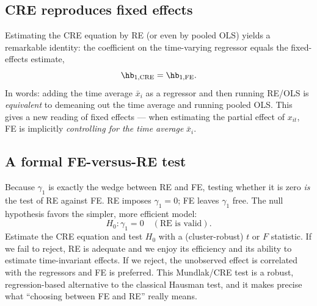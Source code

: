 \subsection{CRE reproduces fixed effects}

Estimating the CRE equation by RE (or even by pooled OLS) yields a remarkable identity: the coefficient on the time-varying regressor equals the fixed-effects estimate,
\[
\hb_{1,\text{CRE}} = \hb_{1,\text{FE}}.
\]
In words: adding the time average $\bar x_i$ as a regressor and then running RE/OLS is \emph{equivalent} to demeaning out the time average and running pooled OLS. This gives a new reading of fixed effects --- when estimating the partial effect of $x_{it}$, FE is implicitly \emph{controlling for the time average} $\bar x_i$.


\subsection{A formal FE-versus-RE test}

Because $\gamma_1$ is exactly the wedge between RE and FE, testing whether it is zero \emph{is} the test of RE against FE. RE imposes $\gamma_1=0$; FE leaves $\gamma_1$ free. The null hypothesis favors the simpler, more efficient model:
\[
H_0: \gamma_1 = 0 \quad (\text{RE is valid}).
\]
Estimate the CRE equation and test $H_0$ with a (cluster-robust) $t$ or $F$ statistic. If we fail to reject, RE is adequate and we enjoy its efficiency and its ability to estimate time-invariant effects. If we reject, the unobserved effect is correlated with the regressors and FE is preferred. This Mundlak/CRE test is a robust, regression-based alternative to the classical Hausman test, and it makes precise what ``choosing between FE and RE'' really means.

